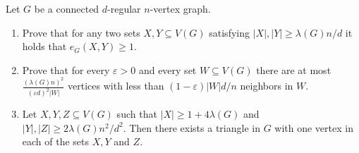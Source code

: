 \documentclass[a4paper, 11pt, oneside]{article}
\newenvironment{problem}[1]
  {\renewcommand\theinnercustomprob{#1}\innercustomprob}
  {\endinnercustomprob}
\newcommand\abs[1]{\left|#1\right|}
\begin{document}
 \begin{problem}{7}\label{problem7}
 Let $G$ be a connected $d$-regular $n$-vertex graph.
 \begin{enumerate}
 \item Prove that for any two sets $X,Y \subseteq V(G)$ satisfying $\abs{X},\abs{Y} \geq \lambda(G)n/d$ it holds that $e_G(X,Y)\geq 1$.
 \item Prove that for every $\varepsilon > 0$ and every set $W \subseteq V(G)$ there are at most $\frac{(\lambda(G)n)^2}{(\varepsilon d)^2\abs{W}}$ vertices with less than $(1 - \varepsilon)\abs{W}d/n$ neighbors in $W$.
 \item Let $X,Y,Z \subseteq V(G)$ such that $\abs{X} \geq 1 + 4\lambda(G)$ and $\abs{Y},\abs{Z} \geq 2\lambda(G)n^2/d^2$. Then there exists a triangle in $G$ with one vertex in each of the sets $X,Y$ and $Z$. 
 \end{enumerate}
 
\end{problem}
\end{document}
